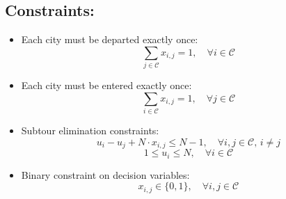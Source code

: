 \documentclass{article}
\begin{document}
\subsection*{Constraints:}
\begin{itemize}
    \item Each city must be departed exactly once:
    \[
    \sum_{j \in \mathcal{C}} x_{i,j} = 1, \quad \forall i \in \mathcal{C}
    \]

    \item Each city must be entered exactly once:
    \[
    \sum_{i \in \mathcal{C}} x_{i,j} = 1, \quad \forall j \in \mathcal{C}
    \]

    \item Subtour elimination constraints:
    \[
    u_i - u_j + N \cdot x_{i,j} \leq N - 1, \quad \forall i, j \in \mathcal{C}, \, i \neq j
    \]
    \[
    1 \leq u_i \leq N, \quad \forall i \in \mathcal{C}
    \]

    \item Binary constraint on decision variables:
    \[
    x_{i,j} \in \{0, 1\}, \quad \forall i, j \in \mathcal{C}
    \]
\end{itemize}
\end{document}

